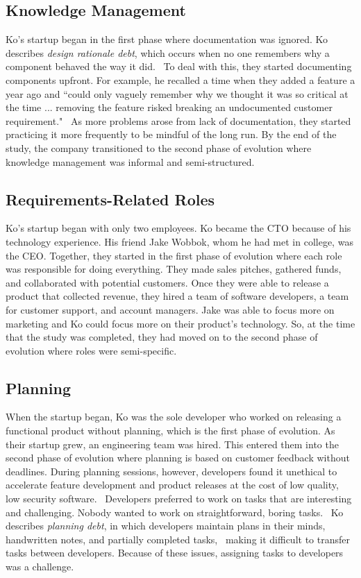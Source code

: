 \documentclass{sig-alternate}
\begin{document}
\subsection{Knowledge Management}
Ko's startup began in the first phase where documentation was ignored. Ko describes \emph{design rationale debt}, which occurs when no one remembers why a component behaved the way it did.~\cite{Ko:2017} To deal with this, they started documenting components upfront. For example, he recalled a time when they added a feature a year ago and ``could only vaguely remember why we thought it was so critical at the time ... removing the feature risked breaking an undocumented customer requirement."~\cite{Ko:2017} As more problems arose from lack of documentation, they started practicing it more frequently to be mindful of the long run. By the end of the study, the company transitioned to the second phase of evolution where knowledge management was informal and semi-structured.

\subsection{Requirements-Related Roles}
Ko's startup began with only two employees. Ko became the CTO because of his technology experience. His friend Jake Wobbok, whom he had met in college, was the CEO. Together, they started in the first phase of evolution where each role was responsible for doing everything. They made sales pitches, gathered funds, and collaborated with potential customers. Once they were able to release a product that collected revenue, they hired a team of software developers, a team for customer support, and account managers. Jake was able to focus more on marketing and Ko could focus more on their product's technology. So, at the time that the study was completed, they had moved on to the second phase of evolution where roles were semi-specific. 

\subsection{Planning}
When the startup began, Ko was the sole developer who worked on releasing a functional product without planning, which is the first phase of evolution. As their startup grew, an engineering team was hired. This entered them into the second phase of evolution where planning is based on customer feedback without deadlines. During planning sessions, however, developers found it unethical to accelerate feature development and product releases at the cost of low quality, low security software.~\cite{Ko:2017} Developers preferred to work on tasks that are interesting and challenging. Nobody wanted to work on straightforward, boring tasks.~\cite{Ko:2017} Ko describes \emph{planning debt}, in which developers maintain plans in their minds, handwritten notes, and partially completed tasks,~\cite{Ko:2017} making it difficult to transfer tasks between developers. Because of these issues, assigning tasks to developers was a challenge.
\end{document}
